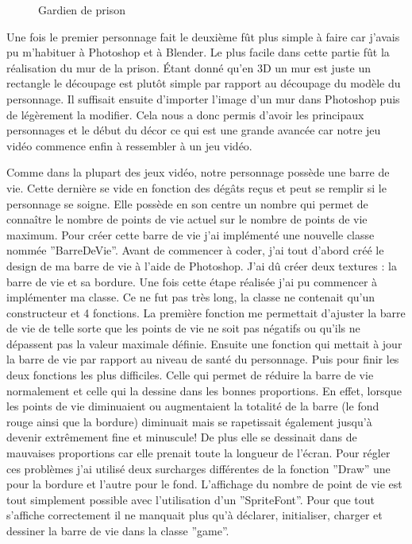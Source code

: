 \documentclass[12pt]{article}
\begin{document}
\begin{figure}[htbp]
\begin{minipage}[c]{.45\linewidth}
\begin{center}
\caption{Gardien de prison}
\label{fig:bellik}
\end{center}
\end{minipage}
\end{figure}

\par
Une fois le premier personnage fait le deuxième fût plus simple à faire car j'avais pu m'habituer à Photoshop et à Blender. Le plus facile dans cette partie fût la réalisation du mur de la prison. Étant donné qu'en 3D un mur est juste un rectangle le découpage est plutôt simple par rapport au découpage du modèle du personnage. Il suffisait ensuite d'importer l'image d'un mur dans Photoshop puis de légèrement la modifier. Cela nous a donc permis d'avoir les principaux personnages et le début du décor ce qui est une grande avancée car notre jeu vidéo commence enfin à ressembler à un jeu vidéo.

\par
Comme dans la plupart des jeux vidéo, notre personnage possède une barre de vie. Cette dernière se vide en fonction des dégâts reçus et peut se remplir si le personnage se soigne. Elle possède en son centre un nombre qui permet de connaître le nombre de points de vie actuel sur le nombre de points de vie maximum. Pour créer cette barre de vie j'ai implémenté une nouvelle classe nommée ''BarreDeVie''. Avant de commencer à coder, j'ai tout d'abord créé le design de ma barre de
vie à l'aide de Photoshop. J'ai dû créer deux textures : la barre de vie et sa bordure. Une fois cette étape réalisée j'ai pu commencer à implémenter ma classe. Ce ne fut pas très long, la classe ne contenait qu'un constructeur et 4 fonctions. La première fonction me permettait d'ajuster la barre de vie de telle sorte que les points de vie ne soit pas négatifs ou qu'ils ne dépassent pas la valeur maximale définie. Ensuite une fonction qui mettait à jour la barre de vie par rapport au niveau de santé du personnage. Puis pour finir les deux fonctions les plus difficiles. Celle qui permet de réduire la barre de vie normalement et celle qui la dessine dans les bonnes proportions. En effet, lorsque les points de vie diminuaient ou augmentaient la totalité de la barre (le fond rouge ainsi que la bordure) diminuait mais se rapetissait également jusqu'à devenir extrêmement fine et minuscule! De plus elle se dessinait dans de mauvaises proportions car elle prenait toute la longueur de l'écran. Pour régler ces problèmes j'ai utilisé deux surcharges différentes de la fonction ''Draw'' une pour la bordure et l'autre pour le fond. L'affichage du nombre de point de vie est tout simplement possible avec l'utilisation d'un ''SpriteFont''. Pour que tout s'affiche correctement il ne manquait plus qu'à déclarer, initialiser, charger et dessiner la barre de vie dans la classe ''game''.
\end{document}

